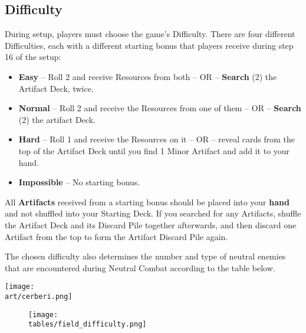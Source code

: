 \begin{multicols}{2}

\subsection*{\hypertarget{Difficulty}{Difficulty}}
During setup, players must choose the game's Difficulty.
There are four different Difficulties, each with a different starting bonus that players receive during step 16 of the setup:
\begin{itemize}
  \item \textbf{Easy} – Roll 2  and receive Resources from both – OR – \textbf{Search} (2) the Artifact Deck, twice.
  \item \textbf{Normal} – Roll 2  and receive the Resources from one of them – OR – \textbf{Search} (2) the artifact Deck.
  \item \textbf{Hard} – Roll 1  and receive the Resources on it – OR – reveal cards from the top of the Artifact Deck until you find 1 Minor Artifact and add it to your hand.
  \item \textbf{Impossible} – No starting bonus.
\end{itemize}


All \textbf{Artifacts} received from a starting bonus should be placed into your \textbf{hand} and not shuffled into your Starting Deck.
If you searched for any Artifacts, shuffle the Artifact Deck and its Discard Pile together afterwards, and then discard one Artifact from the top to form the Artifact Discard Pile again.\par
The chosen difficulty also determines the number and type of neutral enemies that are encountered during Neutral Combat according to the table below.

\vfill
\raggedleft\texttt{[image: \\art/cerberi.png]}

\end{multicols}

\begin{figure*}[!hb]
  \centering
  \texttt{[image: \\tables/field\_difficulty.png]}
\end{figure*}
